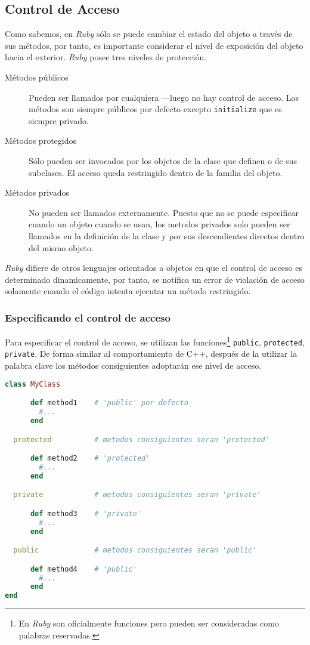 \subsection{Control de Acceso}
Como sabemos, en \textit{Ruby} sólo se puede cambiar el estado del objeto a través de sus métodos, por tanto, es importante considerar el nivel de exposición del objeto hacia el exterior. \textit{Ruby} posee tres niveles de protección.
\begin{description}
	\item[Métodos públicos] Pueden ser llamados por cualquiera ---luego no hay control de acceso. Los métodos son siempre públicos por defecto excepto \texttt{initialize} que es siempre privado.
	\item[Métodos protegidos] Sólo pueden ser invocados por los objetos de la clase que definen o de sus subclases. El acceso queda restringido dentro de la familia del objeto.
	\item[Métodos privados] No pueden ser llamados externamente. Puesto que no se puede especificar cuando un objeto cuando se usan, los metodos privados solo pueden ser llamados en la definición de la clase y por sus descendientes directos dentro del mismo objeto. 
\end{description}

\textit{Ruby} difiere de otros lenguajes orientados a objetos en que el control de acceso es determinado dinamicamente, por tanto, se notifica un error de violación de acceso solamente cuando el código intenta ejecutar un método restringido.

\subsubsection{Especificando el control de acceso}
Para especificar el control de acceso, se utilizan las funciones\footnote{En \textit{Ruby} son oficialmente funciones pero pueden ser consideradas como palabras reservadas.}  \texttt{public}, \texttt{protected}, \texttt{private}. De forma similar al comportamiento de C++, después de la utilizar la palabra clave los métodos consiguientes adoptarán ese nivel de acceso. 

\begin{lstlisting}[language=Ruby]
class MyClass

      def method1    # 'public' por defecto
        #...
      end

  protected          # metodos consiguientes seran 'protected'

      def method2    # 'protected'
        #...
      end

  private            # metodos consiguientes seran 'private'

      def method3    # 'private'
        #...
      end

  public             # metodos consiguientes seran 'public'

      def method4    # 'public'
        #...
      end
end
\end{lstlisting}

